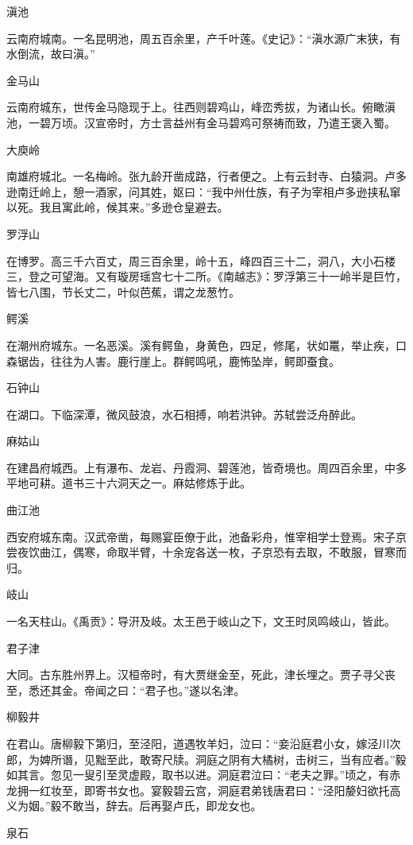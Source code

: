 \documentclass[a4paper,12pt,UTF8,twoside]{ctexbook}
\begin{document}
滇池

云南府城南。一名昆明池，周五百余里，产千叶莲。《史记》：“滇水源广末狭，有水倒流，故曰滇。”

金马山

云南府城东，世传金马隐现于上。往西则碧鸡山，峰峦秀拔，为诸山长。俯瞰滇池，一碧万顷。汉宣帝时，方士言益州有金马碧鸡可祭祷而致，乃遣王褒入蜀。

大庾岭

南雄府城北。一名梅岭。张九龄开凿成路，行者便之。上有云封寺、白猿洞。卢多逊南迁岭上，憩一酒家，问其姓，妪曰：“我中州仕族，有子为宰相卢多逊挟私窜以死。我且寓此岭，候其来。”多逊仓皇避去。

罗浮山

在博罗。高三千六百丈，周三百余里，岭十五，峰四百三十二，洞八，大小石楼三，登之可望海。又有璇房瑶宫七十二所。《南越志》：罗浮第三十一岭半是巨竹，皆七八围，节长丈二，叶似芭蕉，谓之龙葱竹。

鳄溪

在潮州府城东。一名恶溪。溪有鳄鱼，身黄色，四足，修尾，状如鼍，举止疾，口森锯齿，往往为人害。鹿行崖上。群鳄鸣吼，鹿怖坠岸，鳄即蚕食。

石钟山

在湖口。下临深潭，微风鼓浪，水石相搏，响若洪钟。苏轼尝泛舟醉此。

麻姑山

在建昌府城西。上有瀑布、龙岩、丹霞洞、碧莲池，皆奇境也。周四百余里，中多平地可耕。道书三十六洞天之一。麻姑修炼于此。

曲江池

西安府城东南。汉武帝凿，每赐宴臣僚于此，池备彩舟，惟宰相学士登焉。宋子京尝夜饮曲江，偶寒，命取半臂，十余宠各送一枚，子京恐有去取，不敢服，冒寒而归。

岐山

一名天柱山。《禹贡》：导汧及岐。太王邑于岐山之下，文王时凤鸣岐山，皆此。

君子津

大同。古东胜州界上。汉桓帝时，有大贾继金至，死此，津长埋之。贾子寻父丧至，悉还其金。帝闻之曰：“君子也。”遂以名津。

柳毅井

在君山。唐柳毅下第归，至泾阳，道遇牧羊妇，泣曰：“妾沿庭君小女，嫁泾川次郎，为婢所谮，见黜至此，敢寄尺牍。洞庭之阴有大橘树，击树三，当有应者。”毅如其言。忽见一叟引至灵虚殿，取书以进。洞庭君泣曰：“老夫之罪。”顷之，有赤龙拥一红妆至，即寄书女也。宴毅碧云宫，洞庭君弟钱唐君曰：“泾阳嫠妇欲托高义为姻。”毅不敢当，辞去。后再娶卢氏，即龙女也。

泉石
\end{document}
